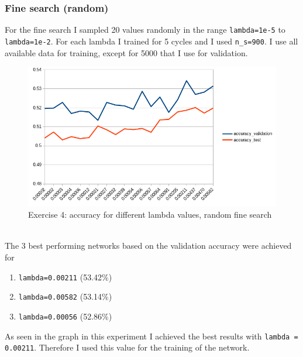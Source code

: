 \subsubsection{Fine search (random)}
For the fine search I sampled 20 values randomly in the range \texttt{lambda=1e-5} to \texttt{lambda=1e-2}.
For each lambda I trained for 5 cycles and I used \texttt{n\_s=900}. I use all available data for training, except for 5000 that I use for validation.
    \begin{figure}[ht]
        \includegraphics[width=\textwidth]{../code/result_pics/fine_search_random_1.png}
        \caption{Exercise 4: accuracy for different lambda values, random fine search}
    \end{figure}
\\
The 3 best performing networks based on the validation accuracy were achieved for
\begin{enumerate}[label=(\arabic*)]
    \item \texttt{lambda=0.00211} (53.42\%)
    \item \texttt{lambda=0.00582} (53.14\%)
    \item \texttt{lambda=0.00056} (52.86\%)
\end{enumerate}
As seen in the graph in this experiment I achieved the best results with \texttt{lambda = 0.00211}. Therefore I used this value for the training of the network.

\clearpage
